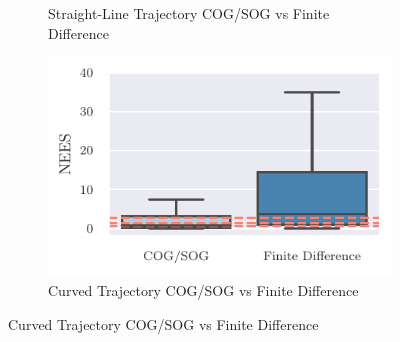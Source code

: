 \begin{figure}
{\begin{subfigure}{0.6\textwidth}
            \caption{Straight-Line Trajectory COG/SOG vs Finite Difference}
            \label{fig:stats_straigth_nees_cog_vs_fd}
        \end{subfigure}
        \begin{subfigure}{0.6\textwidth}
            \includegraphics{figures/curved_line_stats/nees_vs_theoretical_cog_vs_fd.pdf}
            \caption{Curved Trajectory COG/SOG vs Finite Difference}
            \label{fig:stats_curved_nees_cog_vs_df}
        \end{subfigure}
    }
\end{figure}
